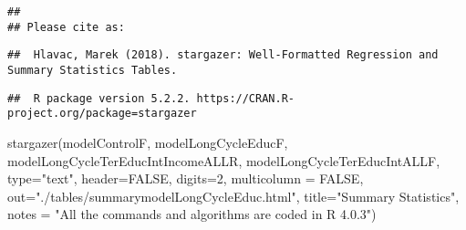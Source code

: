 \documentclass[
]{article}
\newenvironment{Shaded}{\begin{snugshade}}{\end{snugshade}}
\newcommand{\AttributeTok}[1]{\textcolor[rgb]{0.77,0.63,0.00}{#1}}
\newcommand{\ConstantTok}[1]{\textcolor[rgb]{0.00,0.00,0.00}{#1}}
\newcommand{\DecValTok}[1]{\textcolor[rgb]{0.00,0.00,0.81}{#1}}
\newcommand{\FunctionTok}[1]{\textcolor[rgb]{0.00,0.00,0.00}{#1}}
\newcommand{\NormalTok}[1]{#1}
\newcommand{\StringTok}[1]{\textcolor[rgb]{0.31,0.60,0.02}{#1}}
\begin{document}
\begin{verbatim}
## 
## Please cite as:
\end{verbatim}

\begin{verbatim}
##  Hlavac, Marek (2018). stargazer: Well-Formatted Regression and Summary Statistics Tables.
\end{verbatim}

\begin{verbatim}
##  R package version 5.2.2. https://CRAN.R-project.org/package=stargazer
\end{verbatim}

\begin{Shaded}
\begin{Highlighting}[]
\FunctionTok{stargazer}\NormalTok{(modelControlF, modelLongCycleEducF, modelLongCycleTerEducIntIncomeALLR, modelLongCycleTerEducIntALLF, }\AttributeTok{type=}\StringTok{"text"}\NormalTok{, }\AttributeTok{header=}\ConstantTok{FALSE}\NormalTok{, }\AttributeTok{digits=}\DecValTok{2}\NormalTok{, }\AttributeTok{multicolumn =} \ConstantTok{FALSE}\NormalTok{, }\AttributeTok{out=}\StringTok{"./tables/summarymodelLongCycleEduc.html"}\NormalTok{, }\AttributeTok{title=}\StringTok{"Summary Statistics"}\NormalTok{,}
          \AttributeTok{notes =} \StringTok{"All the commands and algorithms are coded in R 4.0.3"}\NormalTok{)}
\end{Highlighting}
\end{Shaded}
\end{document}
